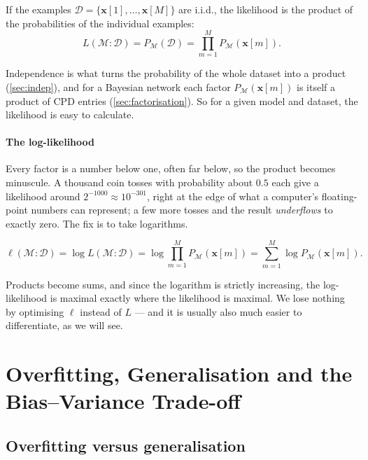 \documentclass[11pt, oneside]{book}
\newcommand{\dataset}{\mathcal{D}}       %
\newcommand{\bx}{\mathbf{x}}  \newcommand{\by}{\mathbf{y}}
\let\originalsection\section
\renewcommand{\section}{\Needspace{7\baselineskip}\originalsection}
\let\originalsubsection\subsection
\renewcommand{\subsection}{\Needspace{6\baselineskip}\originalsubsection}
\begin{document}
\begin{thmbox}[title={Likelihood of i.i.d.\ data}, unbreakable]
If the examples $\dataset = \{\bx[1], \ldots, \bx[M]\}$ are i.i.d., the
likelihood is the product of the probabilities of the individual examples:
\[
L(\mathcal{M} : \dataset) = P_{\mathcal{M}}(\dataset) = \prod_{m=1}^{M} P_{\mathcal{M}}(\bx[m]).
\]
\end{thmbox}

Independence is what turns the probability of the whole dataset into a
product (\cref{sec:indep}), and for a Bayesian network each factor
$P_{\mathcal{M}}(\bx[m])$ is itself a product of CPD entries
(\cref{sec:factorisation}). So for a given model and dataset, the likelihood is
easy to calculate.

\paragraph{The log-likelihood} Every factor is a number below one, often far
below, so the product becomes minuscule. A thousand coin tosses with
probability about $0.5$ each give a likelihood around $2^{-1000} \approx
10^{-301}$, right at the edge of what a computer's floating-point numbers can
represent; a few more tosses and the result \emph{underflows} to exactly zero.
The fix is to take logarithms.

\begin{defbox}[title={Log-likelihood}]
\[
\ell(\mathcal{M} : \dataset) = \log L(\mathcal{M} : \dataset)
= \log \prod_{m=1}^{M} P_{\mathcal{M}}(\bx[m])
= \sum_{m=1}^{M} \log P_{\mathcal{M}}(\bx[m]).
\]
\end{defbox}
Products become sums, and since the logarithm is strictly increasing, the
log-likelihood is maximal exactly where the likelihood is maximal. We lose
nothing by optimising $\ell$ instead of $L$ --- and it is usually also much
easier to differentiate, as we will see.

\section{Overfitting, Generalisation and the Bias--Variance Trade-off}
\label{sec:overfitting}

\subsection{Overfitting versus generalisation}
\end{document}
